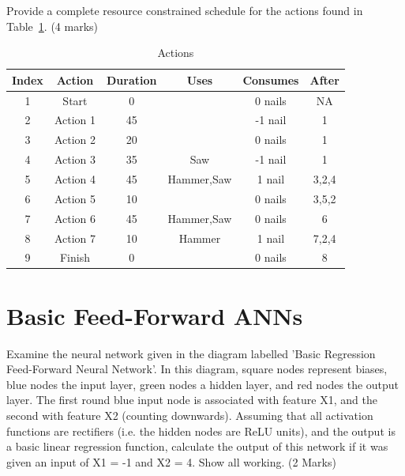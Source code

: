 \documentclass{article}
\begin{document}
Provide a complete resource constrained schedule for the actions found in Table~\ref{schActions}. (4 marks)
\begin{table}[h!]
\caption{Actions}
\label{schActions}
\begin{center}
\begin{tabular}{ |c|c|c|c|c|c| } 
\hline
 Index & Action & Duration & Uses & Consumes & After \\
\hline
1 & Start & 0 &   & 0 nails & NA\\
2 & Action 1 & 45 &   & -1 nail & 1\\
3 & Action 2 & 20 &   & 0 nails & 1\\
4 & Action 3 & 35 &  Saw & -1 nail & 1\\
5 & Action 4 & 45 &  Hammer,Saw & 1 nail & 3,2,4\\
6 & Action 5 & 10 &   & 0 nails & 3,5,2\\
7 & Action 6 & 45 &  Hammer,Saw & 0 nails & 6\\
8 & Action 7 & 10 &  Hammer & 1 nail & 7,2,4\\
9 & Finish & 0 &   & 0 nails & 8\\
\hline
\end{tabular}
\end{center}
\end{table}
\clearpage
\section{Basic Feed-Forward ANNs}

Examine the neural network given in the diagram labelled 'Basic Regression Feed-Forward Neural Network'. In this diagram, square nodes represent biases, blue nodes the input layer, green nodes a hidden layer, and red nodes the output layer. The first round blue input node is associated with feature X1, and the second with feature X2 (counting downwards). Assuming that all activation functions are rectifiers (i.e. the hidden nodes are ReLU units), and the output is a basic linear regression function, calculate the output of this network if it was given an input of X1 = -1 and X2 = 4. Show all working. (2 Marks)
\end{document}
